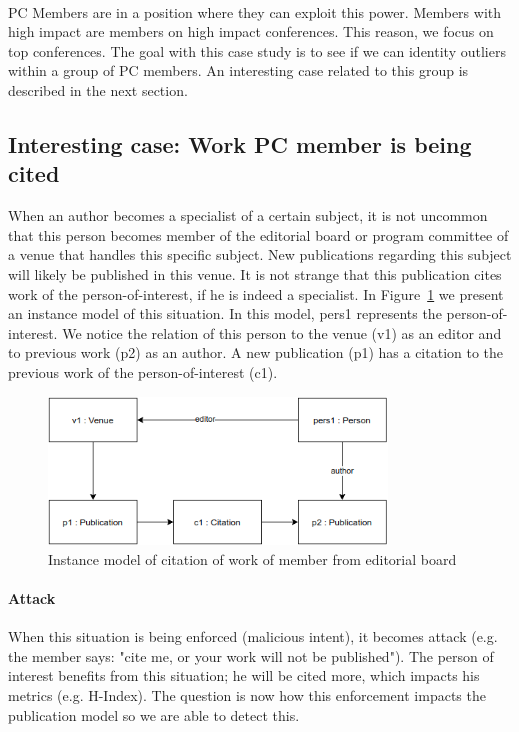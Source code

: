 \documentclass{ou-report}
\begin{document}
\paragraph{}
PC Members are in a position where they can exploit this power. Members with
high impact are members on high impact conferences. This reason, we focus on
top conferences. The goal with this case study is to see if we can identity outliers 
within a group of PC members.
An interesting case related to this group is described in the next section.

\subsection{Interesting case: Work PC member is being cited}
\label{interesting_case:work_member_editorial_board_cited}
When an author becomes a specialist of a certain subject, it is not uncommon 
that this person becomes member of the editorial board or program committee of a 
venue that handles this specific subject.
New publications regarding this subject will likely be published in this venue. 
It is not strange that this publication cites work of the person-of-interest, if 
he is indeed a specialist.
In Figure~\ref{fig:cweb} we present an instance model of this situation. In this 
model, pers1 represents the person-of-interest. We notice the relation of this 
person to the venue (v1) as an editor and to previous work (p2) as an author. A 
new publication (p1) has a citation to the previous work of the 
person-of-interest (c1).

\begin{figure}[H]
\centering
\includegraphics[width=9cm]{images/cite_work_editorial_board.drawio.png}
\caption{Instance model of citation of work of member from editorial board}
\label{fig:cweb}
\end{figure}

\paragraph{Attack} When this situation is being enforced (malicious intent), it 
becomes attack (e.g. the member says: "cite me, or your work will not be 
published"). The person of interest benefits 
from this situation; he will be cited more, which impacts his metrics (e.g. 
H-Index). The question is now how this enforcement impacts the 
publication model so we are able to detect this. 
\end{document}
